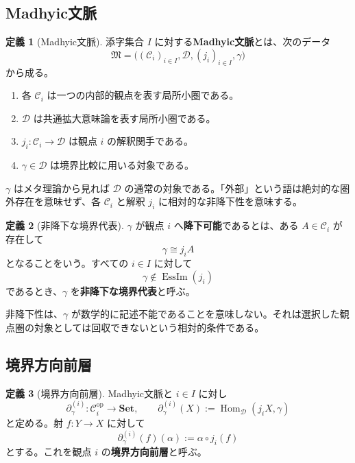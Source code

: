 \documentclass[a4paper,11pt]{ltjsarticle}
\theoremstyle{definition}
\newtheorem{definition}{定義}[section]
\theoremstyle{plain}
\newcommand{\EssIm}{\operatorname{EssIm}}
\newcommand{\Hom}{\operatorname{Hom}}
\newcommand{\Set}{\mathbf{Set}}
\begin{document}
\subsection{Madhyic文脈}

\begin{definition}[Madhyic文脈]
添字集合 $I$ に対する\textbf{Madhyic文脈}とは、次のデータ
\begin{equation}
 \mathfrak M=
 \bigl((\mathcal C_i)_{i\in I},\mathcal D,
       (j_i)_{i\in I},\gamma\bigr)
 \label{eq:madhyic-context}
\end{equation}
から成る。
\begin{enumerate}
 \item 各 $\mathcal C_i$ は一つの内部的観点を表す局所小圏である。
 \item $\mathcal D$ は共通拡大意味論を表す局所小圏である。
 \item $j_i:\mathcal C_i\to\mathcal D$ は観点 $i$ の解釈関手である。
 \item $\gamma\in\mathcal D$ は境界比較に用いる対象である。
\end{enumerate}
\end{definition}

$\gamma$ はメタ理論から見れば $\mathcal D$ の通常の対象である。「外部」という語は絶対的な圏外存在を意味せず、各 $\mathcal C_i$ と解釈 $j_i$ に相対的な非降下性を意味する。

\begin{definition}[非降下な境界代表]
$\gamma$ が観点 $i$ へ\textbf{降下可能}であるとは、ある $A\in\mathcal C_i$ が存在して
\[
 \gamma\cong j_iA
\]
となることをいう。すべての $i\in I$ に対して
\begin{equation}
 \gamma\notin\EssIm(j_i)
 \label{eq:non-descent-gamma}
\end{equation}
であるとき、$\gamma$ を\textbf{非降下な境界代表}と呼ぶ。
\end{definition}

非降下性は、$\gamma$ が数学的に記述不能であることを意味しない。それは選択した観点圏の対象としては回収できないという相対的条件である。

\subsection{境界方向前層}

\begin{definition}[境界方向前層]
Madhyic文脈と $i\in I$ に対し
\begin{equation}
 \partial_\gamma^{(i)}:
 \mathcal C_i^{\mathrm{op}}\longrightarrow\Set,
 \qquad
 \partial_\gamma^{(i)}(X)
 :=\Hom_{\mathcal D}(j_iX,\gamma)
 \label{eq:boundary-presheaf}
\end{equation}
と定める。射 $f:Y\to X$ に対して
\[
 \partial_\gamma^{(i)}(f)(\alpha)
 :=\alpha\circ j_i(f)
\]
とする。これを観点 $i$ の\textbf{境界方向前層}と呼ぶ。
\end{definition}
\end{document}

